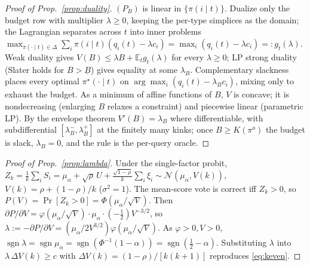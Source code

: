 \documentclass[11pt]{article}
\theoremstyle{plain}
\theoremstyle{definition}
\newcommand{\E}{\mathbb{E}}
\begin{document}
\begin{proof}[Proof of Prop.~\ref{prop:duality}]
$(P_B)$ is linear in $\{\pi(i\mid t)\}$. Dualize only the budget row with multiplier $\lambda\ge0$, keeping the per-type
simplices as the domain; the Lagrangian separates across $t$ into inner problems
$\max_{\pi(\cdot\mid t)\in\Delta}\sum_i\pi(i\mid t)(q_i(t)-\lambda c_i)=\max_i(q_i(t)-\lambda c_i)=:g_t(\lambda)$. Weak duality
gives $V(B)\le\lambda B+\E_t g_t(\lambda)$ for every $\lambda\ge0$; LP strong duality (Slater holds for $B>\underline B$) gives
equality at some $\lambda_B$. Complementary slackness places every optimal $\pi^\star(\cdot\mid t)$ on
$\arg\max_i(q_i(t)-\lambda_B c_i)$, mixing only to exhaust the budget. As a minimum of affine functions of $B$, $V$ is concave;
it is nondecreasing (enlarging $B$ relaxes a constraint) and piecewise linear (parametric LP). By the envelope theorem
$V'(B)=\lambda_B$ where differentiable, with subdifferential $[\lambda_B^-,\lambda_B^+]$ at the finitely many kinks; once
$B\ge K(\pi^o)$ the budget is slack, $\lambda_B=0$, and the rule is the per-query oracle.
\end{proof}
\begin{proof}[Proof of Prop.~\ref{prop:lambda}]
Under the single-factor probit, $Z_k=\tfrac1k\sum_i S_i=\mu_\alpha+\sqrt\rho\,U+\tfrac{\sqrt{1-\rho}}{k}\sum_i\xi_i\sim\mathcal N(\mu_\alpha,V(k))$,
$V(k)=\rho+(1-\rho)/k$ ($\sigma^2{=}1$). The mean-score vote is correct iff $Z_k>0$, so $P(V)=\Pr[Z_k>0]=\Phi(\mu_\alpha/\sqrt V)$.
Then $\partial P/\partial V=\varphi(\mu_\alpha/\sqrt V)\cdot \mu_\alpha\cdot(-\tfrac12)V^{-3/2}$, so $\lambda:=-\partial P/\partial V=(\mu_\alpha/2V^{3/2})\varphi(\mu_\alpha/\sqrt V)$.
As $\varphi>0,V>0$, $\operatorname{sgn}\lambda=\operatorname{sgn}\mu_\alpha=\operatorname{sgn}(\Phi^{-1}(1-\alpha))=\operatorname{sgn}(\tfrac12-\alpha)$.
Substituting $\lambda$ into $\lambda\,\Delta V(k)\ge c$ with $\Delta V(k)=(1-\rho)/[k(k+1)]$ reproduces \eqref{eq:keven}.
\end{proof}
\end{document}
